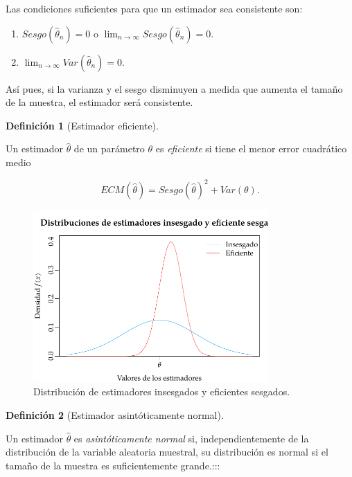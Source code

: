 \documentclass[
  a4paper,
]{scrreport}
\providecommand{\tightlist}{%
  \setlength{\itemsep}{0pt}\setlength{\parskip}{0pt}}\usepackage{longtable,booktabs,array}
\theoremstyle{plain}
\theoremstyle{definition}
\theoremstyle{definition}
\newtheorem{definition}{Definición}[chapter]
\theoremstyle{remark}
\begin{document}
Las condiciones suficientes para que un estimador sea consistente son:

\begin{enumerate}
\def\labelenumi{\arabic{enumi}.}
\tightlist
\item
  \(Sesgo(\hat \theta_n)=0\) o
  \(\lim_{n\rightarrow \infty}Sesgo(\hat \theta_n)=0\).
\item
  \(\lim_{n\rightarrow \infty}Var(\hat \theta_n)=0\).
\end{enumerate}

Así pues, si la varianza y el sesgo disminuyen a medida que aumenta el
tamaño de la muestra, el estimador será consistente.

\begin{definition}[Estimador
eficiente]\protect\hypertarget{def-estimador-eficiente}{}\label{def-estimador-eficiente}

Un estimador \(\hat \theta\) de un parámetro \(\theta\) es
\emph{eficiente} si tiene el menor error cuadrático medio

\[
ECM(\hat \theta) = Sesgo(\hat \theta)^2+Var(\theta).
\]

\end{definition}

\begin{figure}

{\centering \includegraphics[width=0.8\textwidth,height=\textheight]{img/estimacion/estimador-eficiente-sesgado.pdf}

}

\caption{Distribución de estimadores insesgados y eficientes sesgados.}

\end{figure}

\begin{definition}[Estimador asintóticamente
normal]\protect\hypertarget{def-estimador-asintóticamente-normal}{}\label{def-estimador-asintóticamente-normal}

Un estimador \(\hat \theta\) es \emph{asintóticamente normal} si,
independientemente de la distribución de la variable aleatoria muestral,
su distribución es normal si el tamaño de la muestra es suficientemente
grande.:::

\end{definition}
\end{document}
